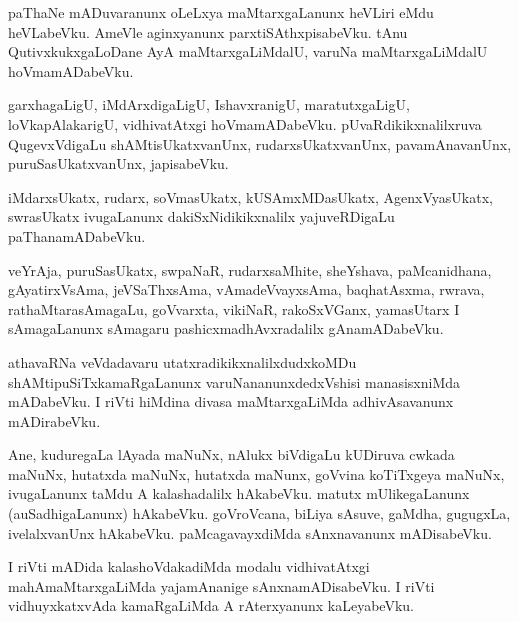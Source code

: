 \documentclass{article}
\begin{document}
\begin{mn}
paThaNe  mADuvaranunx  oLeLxya  maMtarxgaLanunx  heVLiri  eMdu  heVLabeVku.  AmeVle  aginxyanunx  
parxtiSAthxpisabeVku.  tAnu  QutivxkukxgaLoDane  AyA  maMtarxgaLiMdalU,  varuNa  maMtarxgaLiMdalU  hoVmamADabeVku.
\end{mn}

\begin{mn}
garxhagaLigU,  iMdArxdigaLigU,  IshavxranigU,  maratutxgaLigU,  loVkapAlakarigU,  vidhivatAtxgi  
hoVmamADabeVku.  pUvaRdikikxnalilxruva  QugevxVdigaLu  shAMtisUkatxvanUnx,  rudarxsUkatxvanUnx,  
pavamAnavanUnx,  puruSasUkatxvanUnx,  japisabeVku.
\end{mn}

\begin{mn}
iMdarxsUkatx,  rudarx,  soVmasUkatx,  kUSAmxMDasUkatx,  AgenxVyasUkatx,  swrasUkatx  ivugaLanunx  
dakiSxNidikikxnalilx  yajuveRDigaLu  paThanamADabeVku.
\end{mn}

\begin{mn}
veYrAja,  puruSasUkatx,  swpaNaR,  rudarxsaMhite,  sheYshava,  paMcanidhana,  gAyatirxVsAma,  
jeVSaThxsAma,  vAmadeVvayxsAma,  baqhatAsxma,  rwrava,  rathaMtarasAmagaLu,  goVvarxta,  vikiNaR,  
rakoSxVGanx,  yamasUtarx  I  sAmagaLanunx  sAmagaru  pashicxmadhAvxradalilx  gAnamADabeVku.
\end{mn}

\begin{mn}
athavaRNa  veVdadavaru  utatxradikikxnalilxdudxkoMDu  shAMtipuSiTxkamaRgaLanunx  varuNananunxdedxVshisi  
manasisxniMda  mADabeVku.  I riVti  hiMdina  divasa  maMtarxgaLiMda  adhivAsavanunx  mADirabeVku.
\end{mn}

\begin{mn}
Ane,  kuduregaLa  lAyada  maNuNx,  nAlukx  biVdigaLu  kUDiruva  cwkada  maNuNx,  hutatxda  maNuNx,  
hutatxda  maNunx,  goVvina  koTiTxgeya  maNuNx,  ivugaLanunx  taMdu  A  kalashadalilx  hAkabeVku.  matutx  
mUlikegaLanunx (auSadhigaLanunx) hAkabeVku.  goVroVcana,  biLiya  sAsuve,  gaMdha,  gugugxLa,  ivelalxvanUnx  
hAkabeVku.  paMcagavayxdiMda  sAnxnavanunx  mADisabeVku.
\end{mn}

\begin{mn}
I riVti  mADida  kalashoVdakadiMda  modalu  vidhivatAtxgi  mahAmaMtarxgaLiMda  yajamAnanige  
sAnxnamADisabeVku.  I riVti  vidhuyxkatxvAda  kamaRgaLiMda  A  rAterxyanunx  kaLeyabeVku.
\end{mn}
\end{document}
